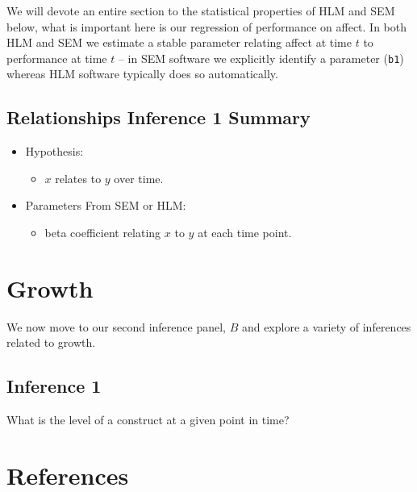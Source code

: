 \documentclass[english,,man]{apa6}
\providecommand{\tightlist}{%
  \setlength{\itemsep}{0pt}\setlength{\parskip}{0pt}}
\theoremstyle{definition}
\theoremstyle{definition}
\theoremstyle{definition}
\theoremstyle{remark}
\begin{document}
We will devote an entire section to the statistical properties of HLM
and SEM below, what is important here is our regression of performance
on affect. In both HLM and SEM we estimate a stable parameter relating
affect at time \(t\) to performance at time \(t\) -- in SEM software we
explicitly identify a parameter (\texttt{b1}) whereas HLM software
typically does so automatically.

\hypertarget{relationships-inference-1-summary}{%
\subsection{Relationships Inference 1
Summary}\label{relationships-inference-1-summary}}

\begin{itemize}
\item
  Hypothesis:

  \begin{itemize}
  \tightlist
  \item
    \(x\) relates to \(y\) over time.
  \end{itemize}
\item
  Parameters From SEM or HLM:

  \begin{itemize}
  \tightlist
  \item
    beta coefficient relating \(x\) to \(y\) at each time point.
  \end{itemize}
\end{itemize}

\hypertarget{growth}{%
\section{Growth}\label{growth}}

We now move to our second inference panel, \(B\) and explore a variety
of inferences related to growth.

\hypertarget{inference-1-1}{%
\subsection{Inference 1}\label{inference-1-1}}

What is the level of a construct at a given point in time?

\newpage

\hypertarget{references}{%
\section{References}\label{references}}
\end{document}
